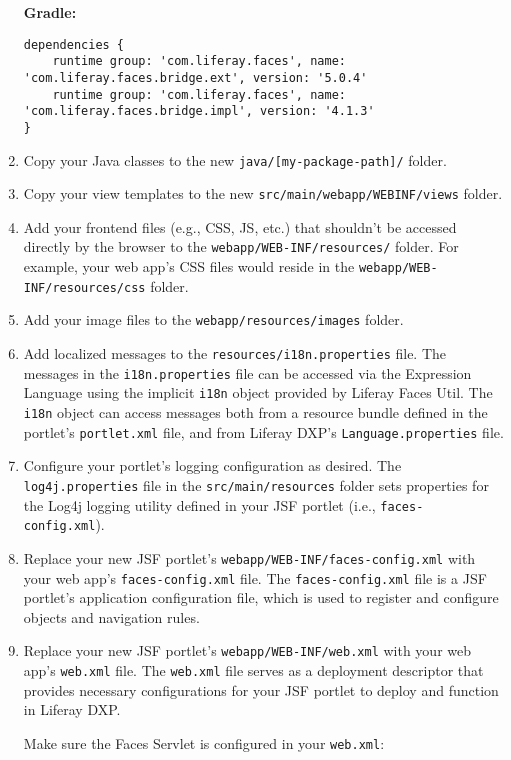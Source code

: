 \begin{enumerate}
  \textbf{Gradle:}

\begin{verbatim}
dependencies {
    runtime group: 'com.liferay.faces', name: 'com.liferay.faces.bridge.ext', version: '5.0.4'
    runtime group: 'com.liferay.faces', name: 'com.liferay.faces.bridge.impl', version: '4.1.3'
}
\end{verbatim}
\item
  Copy your Java classes to the new \texttt{java/{[}my-package-path{]}/}
  folder.
\item
  Copy your view templates to the new
  \texttt{src/main/webapp/WEBINF/views} folder.
\item
  Add your frontend files (e.g., CSS, JS, etc.) that shouldn't be
  accessed directly by the browser to the
  \texttt{webapp/WEB-INF/resources/} folder. For example, your web app's
  CSS files would reside in the \texttt{webapp/WEB-INF/resources/css}
  folder.
\item
  Add your image files to the \texttt{webapp/resources/images} folder.
\item
  Add localized messages to the \texttt{resources/i18n.properties} file.
  The messages in the \texttt{i18n.properties} file can be accessed via
  the Expression Language using the implicit \texttt{i18n} object
  provided by Liferay Faces Util. The \texttt{i18n} object can access
  messages both from a resource bundle defined in the portlet's
  \texttt{portlet.xml} file, and from Liferay DXP's
  \texttt{Language.properties} file.
\item
  Configure your portlet's logging configuration as desired. The
  \texttt{log4j.properties} file in the \texttt{src/main/resources}
  folder sets properties for the Log4j logging utility defined in your
  JSF portlet (i.e., \texttt{faces-config.xml}).
\item
  Replace your new JSF portlet's
  \texttt{webapp/WEB-INF/faces-config.xml} with your web app's
  \texttt{faces-config.xml} file. The \texttt{faces-config.xml} file is
  a JSF portlet's application configuration file, which is used to
  register and configure objects and navigation rules.
\item
  Replace your new JSF portlet's \texttt{webapp/WEB-INF/web.xml} with
  your web app's \texttt{web.xml} file. The \texttt{web.xml} file serves
  as a deployment descriptor that provides necessary configurations for
  your JSF portlet to deploy and function in Liferay DXP.

  Make sure the Faces Servlet is configured in your \texttt{web.xml}:


\end{enumerate}
